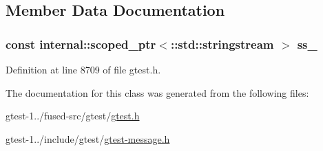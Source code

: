 \subsection{\-Member \-Data \-Documentation}
\hypertarget{classtesting_1_1Message_a7ea18128a6a40e3774ee8148ce4f77f3}{
\subsubsection[{ss\-\_\-}]{\setlength{\rightskip}{0pt plus 5cm}const {\bf internal\-::scoped\-\_\-ptr}$<$\-::std\-::stringstream $>$ {\bf ss\-\_\-}}}\label{d3/d98/classtesting_1_1Message_a7ea18128a6a40e3774ee8148ce4f77f3}


\-Definition at line 8709 of file gtest.\-h.



\-The documentation for this class was generated from the following files\-:\begin{DoxyCompactItemize}
\item 
gtest-\/1../fused-\/src/gtest/\hyperlink{fused-src_2gtest_2gtest_8h}{gtest.\-h}\item 
gtest-\/1../include/gtest/\hyperlink{gtest-message_8h}{gtest-\/message.\-h}\end{DoxyCompactItemize}
